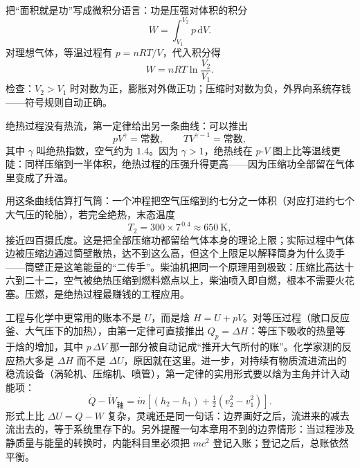 \begin{mathbridge}
把“面积就是功”写成微积分语言：功是压强对体积的积分
\[
  W=\int_{V_1}^{V_2} p\,\mathrm{d}V .
\]
对理想气体，等温过程有 \(p=nRT/V\)，代入积分得
\[
  W=nRT\ln\frac{V_2}{V_1}.
\]
检查：\(V_2>V_1\) 时对数为正，膨胀对外做正功；压缩时对数为负，外界向系统存钱——符号规则自动正确。

绝热过程没有热流，第一定律给出另一条曲线：可以推出
\[
  pV^{\gamma}=\text{常数},\qquad TV^{\gamma-1}=\text{常数},
\]
其中 \(\gamma\) 叫绝热指数，空气约为 \(1.4\)。因为 \(\gamma>1\)，绝热线在 \(p\)-\(V\) 图上比等温线更陡：同样压缩到一半体积，绝热过程的压强升得更高——因为压缩功全部留在气体里变成了升温。

用这条曲线估算打气筒：一个冲程把空气压缩到约七分之一体积（对应打进约七个大气压的轮胎），若完全绝热，末态温度
\[
  T_2=300\times 7^{\,0.4}\approx 650\ \mathrm{K},
\]
接近四百摄氏度。这是把全部压缩功都留给气体本身的理论上限；实际过程中气体边被压缩边通过筒壁散热，达不到这么高，但这个上限足以解释筒身为什么烫手——筒壁正是这笔能量的“二传手”。柴油机把同一个原理用到极致：压缩比高达十六到二十二，空气被绝热压缩到燃料燃点以上，柴油喷入即自燃，根本不需要火花塞。压燃，是绝热过程最赚钱的工程应用。
\end{mathbridge}

\begin{challenge}
工程与化学中更常用的账本不是 \(U\)，而是焓 \(H=U+pV\)。对等压过程（敞口反应釜、大气压下的加热），由第一定律可直接推出 \(Q_p=\Delta H\)：等压下吸收的热量等于焓的增加，其中 \(p\,\Delta V\) 那一部分被自动记成“推开大气所付的账”。化学家测的反应热大多是 \(\Delta H\) 而不是 \(\Delta U\)，原因就在这里。进一步，对持续有物质流进流出的稳流设备（涡轮机、压缩机、喷管），第一定律的实用形式要以焓为主角并计入动能项：
\[
  \dot Q-\dot W_{\text{轴}}=\dot m\left[\left(h_2-h_1\right)+\tfrac12\left(v_2^2-v_1^2\right)\right].
\]
形式上比 \(\Delta U=Q-W\) 复杂，灵魂还是同一句话：边界画好之后，流进来的减去流出去的，等于系统里存下的。另外提醒一句本章用不到的边界情形：当过程涉及静质量与能量的转换时，内能科目里必须把 \(mc^2\) 登记入账；登记之后，总账依然平衡。
\end{challenge}


